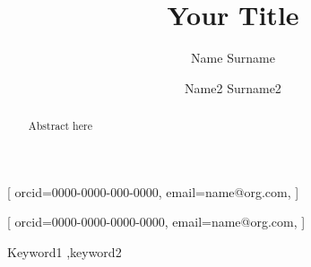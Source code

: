 \documentclass[]{ceurart}
\begin{document}


\title{Your Title}

\author[1]{Name Surname}[%
orcid=0000-0000-000-0000,
email=name@org.com,
]
\address[1]{Institute, City, Country}
%
\author[2,3]{Name2 Surname2}[%
orcid=0000-0000-0000-0000,
email=name@org.com,
]
\address[2]{Institute, City, Country}
\address[3]{Institute, City, Country}



\begin{abstract}
  Abstract here
\end{abstract}

\begin{keywords}
  Keyword1 \sep keyword2
\end{keywords}

\maketitle






%
%
\end{document}
